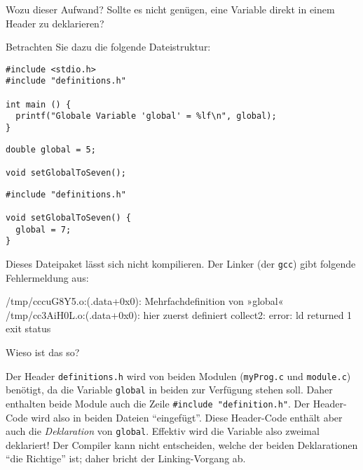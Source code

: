 Wozu dieser Aufwand? Sollte es nicht genügen, eine Variable direkt in einem Header zu deklarieren?

Betrachten Sie dazu die folgende Dateistruktur:
\begin{codebox}
\begin{verbatim}
#include <stdio.h>
#include "definitions.h"

int main () {
  printf("Globale Variable 'global' = %lf\n", global);
}
\end{verbatim}
\end{codebox}

\begin{codebox}
\begin{verbatim}
double global = 5;

void setGlobalToSeven();
\end{verbatim}
\end{codebox}

\begin{codebox}
\begin{verbatim}
#include "definitions.h"

void setGlobalToSeven() {
  global = 7;
}
\end{verbatim}
\end{codebox}

Dieses Dateipaket lässt sich nicht kompilieren. Der Linker (\ie der \texttt{gcc}) gibt folgende  Fehlermeldung aus:

\begin{cmdbox}
/tmp/cccuG8Y5.o:(.data+0x0): Mehrfachdefinition von »global«
/tmp/cc3AiH0L.o:(.data+0x0): hier zuerst definiert
collect2: error: ld returned 1 exit status
\end{cmdbox}

Wieso ist das so?

Der Header \texttt{definitions.h} wird von beiden Modulen (\texttt{myProg.c} und \texttt{module.c}) benötigt, da die Variable \texttt{global} in beiden zur Verfügung stehen soll. Daher enthalten beide Module auch die Zeile \texttt{#include "definition.h"}. Der Header-Code wird also in beiden Dateien \enquote{eingefügt}. Diese Header-Code enthält aber auch die \emph{Deklaration} von \texttt{global}. Effektiv wird die Variable also zweimal deklariert! Der Compiler kann nicht entscheiden, welche der beiden Deklarationen \enquote{die Richtige} ist; daher bricht der Linking-Vorgang ab.


